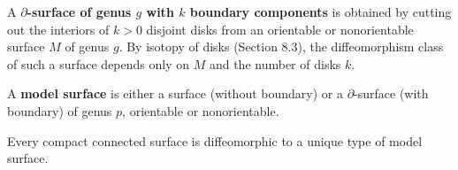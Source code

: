 A \textbf{$\partial$-surface of genus $g$ with $k$ boundary components} is obtained by cutting out the interiors of $k > 0$ disjoint disks from an orientable or nonorientable surface $M$ of genus $g$. By isotopy of disks (Section 8.3), the diffeomorphism class of such a surface depends only on $M$ and the number of disks $k$.

A \textbf{model surface} is either a surface (without boundary) or a $\partial$-surface (with boundary) of genus $p$, orientable or nonorientable.

Every compact connected surface is diffeomorphic to a unique type of model surface.
